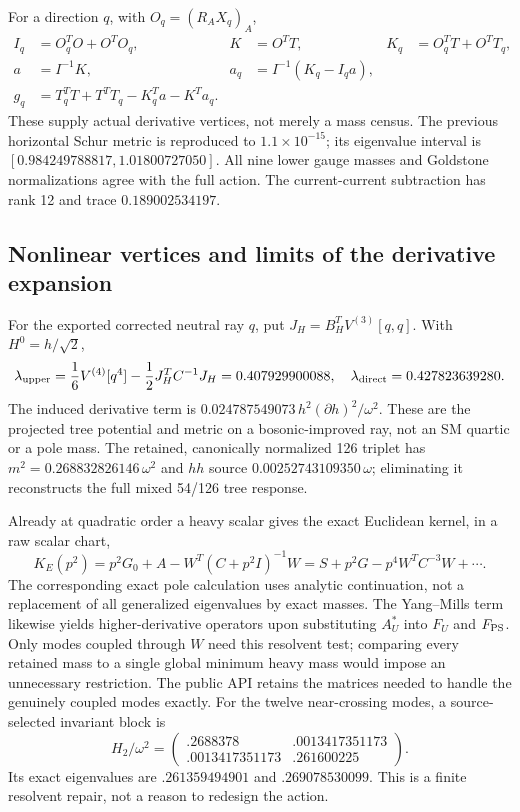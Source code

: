 \documentclass[11pt]{article}
\begin{document}
For a direction $q$, with $O_q=(R_AX_q)_A$,
\begin{align}
 I_q&=O_q^TO+O^TO_q,& K&=O^TT,& K_q&=O_q^TT+O^TT_q,\\
 a&=I^{-1}K,& a_q&=I^{-1}(K_q-I_qa),\\
 g_q&=T_q^TT+T^TT_q-K_q^Ta-K^Ta_q.
\end{align}
These supply actual derivative vertices, not merely a mass census.
The previous horizontal Schur metric is reproduced to $1.1\times10^{-15}$;
its eigenvalue interval is $[0.984249788817,1.01800727050]$.
All nine lower gauge masses and Goldstone normalizations agree with
the full action. The current-current subtraction has rank 12 and trace
$0.189002534197$.

\subsection{Nonlinear vertices and limits of the derivative expansion}
For the exported corrected neutral ray $q$, put
$J_H=B_H^TV^{(3)}[q,q]$. With $H^0=h/\sqrt2$,
\begin{equation}
 \lambda_{\rm upper}=\frac16V^{(4)}[q^4]
 -\frac12J_H^TC^{-1}J_H=0.407929900088,
 \quad \lambda_{\rm direct}=0.427823639280.
\end{equation}
The induced derivative term is
$0.024787549073\,h^2(\partial h)^2/\omega^2$.
These are the projected tree potential and metric on a bosonic-improved
ray, not an SM quartic or a pole mass. The retained, canonically
normalized 126 triplet has $m^2=0.268832826146\,\omega^2$ and
$hh$ source $0.00252743109350\,\omega$; eliminating it reconstructs
the full mixed 54/126 tree response.

Already at quadratic order a heavy scalar gives the exact Euclidean
kernel, in a raw scalar chart,
\begin{equation}
 K_E(p^2)=p^2G_0+A-W^T(C+p^2I)^{-1}W
 =S+p^2G-p^4W^TC^{-3}W+\cdots. \label{eq:resolvent}
\end{equation}
The corresponding exact pole calculation uses analytic continuation,
not a replacement of all generalized eigenvalues by exact masses.
The Yang--Mills term likewise yields higher-derivative operators upon
substituting $A_U^*$ into $F_U$ and $F_{\rm PS}$.
Only modes coupled through $W$ need this resolvent test; comparing every
retained mass to a single global minimum heavy mass would impose an
unnecessary restriction. The public API retains the matrices needed
to handle the genuinely coupled modes exactly.
For the twelve near-crossing modes, a source-selected invariant block is
\begin{equation}
 H_2/\omega^2=\begin{pmatrix}.2688378&.0013417351173\\
 .0013417351173&.261600225\end{pmatrix}.
\end{equation}
Its exact eigenvalues are $.261359494901$ and $.269078530099$.
This is a finite resolvent repair, not a reason to redesign the action.
\end{document}
